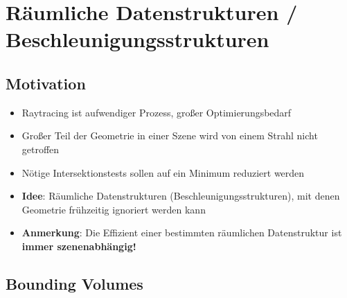 \section{Räumliche Datenstrukturen / Beschleunigungsstrukturen}%
\label{ds:sec:raeumliche_datenstrukturen_beschleunigungsstrukturen}

\subsection{Motivation}%
\label{ds:sub:motivation}

\begin{itemize}
	\item Raytracing ist aufwendiger Prozess, großer Optimierungsbedarf
	\item Großer Teil der Geometrie in einer Szene wird von einem Strahl nicht getroffen
	\item Nötige Intersektionstests sollen auf ein Minimum reduziert werden
	\item \textbf{Idee}: Räumliche Datenstrukturen (Beschleunigungsstrukturen), mit denen Geometrie frühzeitig ignoriert werden kann
	\item \textbf{Anmerkung}: Die Effizient einer bestimmten räumlichen Datenstruktur ist \textbf{immer szenenabhängig!}
\end{itemize}

\subsection{Bounding Volumes}%
\label{ds:sub:bounding_volumes}

